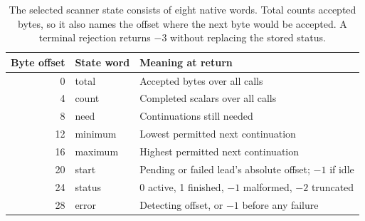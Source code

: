 \begin{table}[htbp]
  \centering
  \small
  \begin{tabular}{rll}
    \toprule
    Byte offset & State word & Meaning at return                                      \\
    \midrule
    0           & total      & Accepted bytes over all calls                          \\
    4           & count      & Completed scalars over all calls                       \\
    8           & need       & Continuations still needed                             \\
    12          & minimum    & Lowest permitted next continuation                     \\
    16          & maximum    & Highest permitted next continuation                    \\
    20          & start      & Pending or failed lead's absolute offset; $-1$ if idle \\
    24          & status     & 0 active, 1 finished, $-1$ malformed, $-2$ truncated   \\
    28          & error      & Detecting offset, or $-1$ before any failure           \\
    \bottomrule
  \end{tabular}
  \caption{The selected scanner state consists of eight native words. Total counts accepted bytes, so it also names the offset where the next byte would be accepted. A terminal rejection returns $-3$ without replacing the stored status.}
  \label{tab:revision-utf8-state}
\end{table}
